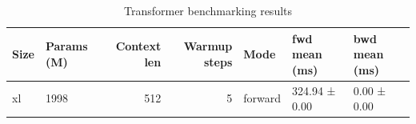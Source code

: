 \begin{table}
\caption{Transformer benchmarking results}
\label{tab:benchmarks}
\begin{tabular}{llrrlll}
\toprule
Size & Params (M) & Context len & Warmup steps & Mode & fwd mean (ms) & bwd mean (ms) \\
\midrule
xl & 1998 & 512 & 5 & forward & 324.94 ± 0.00 & 0.00 ± 0.00 \\
\bottomrule
\end{tabular}
\end{table}
